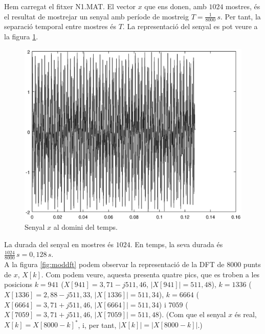 \documentclass[11pt,a4]{article}
\numberwithin{equation}{section}
\theoremstyle{thmstyle}
\theoremstyle{thmstyle}
\theoremstyle{thmstyle}
\theoremstyle{thmstyle}
\theoremstyle{thmstyle}
\theoremstyle{thmstyle}
\theoremstyle{thmstyle}
\begin{document}
Hem carregat el fitxer N1.MAT. El vector $x$ que ens donen, amb $1024$ mostres, és el resultat de mostrejar un senyal amb període de mostreig $T=\frac{1}{8000}\,s$. Per tant, la separació temporal entre mostres és $T$. La representació del senyal es pot veure a la figura \ref{fig:senyalx}.
\\

\begin{figure}
\includegraphics[scale=0.7]{senyalx.eps} 
\caption{Senyal $x$ al domini del temps.}
\label{fig:senyalx}
\end{figure}

La durada del senyal en mostres és $1024$. En temps, la seva durada és $\frac{1024}{8000}\,s=0,128\,s$.
\\

A la figura \ref{fig:moddft} podem observar la representació de la DFT de $8000$ punts de $x$, $X[k]$. Com podem veure, aquesta presenta quatre pics, que es troben a les posicions $k=941$ ($X[941] = 3,71-j511,46$, $\vert X[941]\vert=511,48$), $k=1336$ ($X[1336] = 2,88-j511,33$, $\vert X[1336]\vert=511,34$), $k=6664$ ($X[6664] = 3,71+j511,46$, $\vert X[6664]\vert=511,34$) i $7059$ ($X[7059] = 3,71+j511,46$, $\vert X[7059]\vert=511,48$). (Com que el senyal $x$ és real, $X[k] = X[8000-k]^\ast$, i, per tant, $\vert X[k]\vert = \vert X[8000-k]\vert$.)
\\
\end{document}
